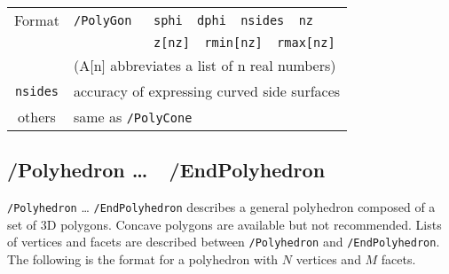 \begin{tabular}{|c|l|}
\hline%
Format & \verb+/PolyGon   sphi  dphi  nsides  nz+ \\
       & \verb+           z[nz]  rmin[nz]  rmax[nz]+ \\
       & (A[n] abbreviates a list of n real numbers) \\
\hline%
\verb+nsides+   & accuracy of expressing curved side surfaces\\
\hline%
others & same as \verb+/PolyCone+ \\
\hline%
\end{tabular}

\subsection{/Polyhedron \ldots\ \ /EndPolyhedron}  

\verb+/Polyhedron+ \ldots{} \verb+/EndPolyhedron+
describes a general polyhedron composed of a set of 3D polygons.  
Concave polygons are available but not recommended.  
Lists of vertices and
facets are described between \verb+/Polyhedron+ and \verb+/EndPolyhedron+.  
The following is the format for a polyhedron with  
$N$ vertices and $M$ facets.
\vspace{.20in}

